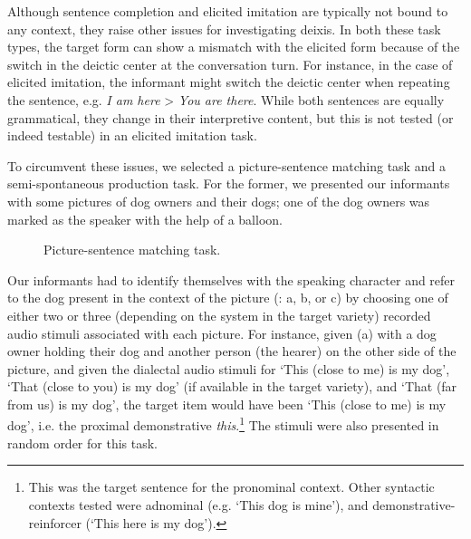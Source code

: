 \documentclass[output=paper,hidelinks]{langscibook}
\begin{document}
Although sentence completion and elicited imitation are typically not bound to any context, they raise other issues for investigating deixis. In both these task types, the target form can show a mismatch with the elicited form because of the switch in the deictic center at the conversation turn. For instance, in the case of elicited imitation, the informant might switch the deictic center when repeating the sentence, e.g. \textit{I am here} > \textit{You are there}. While both sentences are equally grammatical, they change in their interpretive content, but this is not tested (or indeed testable) in an elicited imitation task. 

To circumvent these issues, we selected a picture-sentence matching task and a semi-spontaneous production task. For the former, we presented our informants with some pictures of dog owners and their dogs; one of the dog owners was marked as the speaker with the help of a balloon.

\begin{figure}
\caption{Picture-sentence matching task.}
\label{fig:dogs}
\end{figure}

Our informants had to identify themselves with the speaking character and refer to the dog present in the context of the picture (: a, b, or c) by choosing one of either two or three (depending on the system in the target variety) recorded audio stimuli associated with each picture. For instance, given (a) with a dog owner holding their dog and another person (the hearer) on the other side of the picture, and given the dialectal audio stimuli for ‘This (close to me) is my dog’, ‘That (close to you) is my dog’ (if available in the target variety), and ‘That (far from us) is my dog’, the target item would have been ‘This (close to me) is my dog’, i.e. the proximal demonstrative \textit{this}.\footnote{This was the target sentence for the pronominal context. Other syntactic contexts tested were adnominal (e.g. ‘This dog is mine’), and demonstrative-reinforcer (‘This here is my dog’).} The stimuli were also presented in random order for this task.
\end{document}
